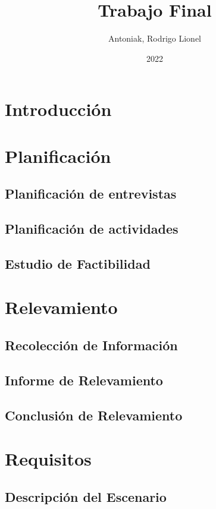 \documentclass[12pt,a4paper]{book}
\title{Trabajo Final}
\author{Antoniak, Rodrigo Lionel}
\date{2022}
\begin{document}
	\frontmatter
	
	\cleardoublepage
	\pagestyle{plain}
	\setcounter{page}{3}
	\tableofcontents
	\listoffigures
	\listoftables
	\cleardoublepage
	\mainmatter
	\pagestyle{headings}
	\setcounter{page}{13}
	\part{Introducción}
	
	\part{Planificación}
	\chapter[Entrevistas]{Planificación de entrevistas}
	
	\chapter[Actividades]{Planificación de actividades}
  
	\chapter[Factibilidad]{Estudio de Factibilidad}
  
	\part{Relevamiento}
	\chapter[Recolección]{Recolección de Información}
	
	\chapter[Informe]{Informe de Relevamiento}
	
	\chapter[Conclusión]{Conclusión de Relevamiento}
	
	\part{Requisitos}
	\chapter[Escenario]{Descripción del Escenario}
	
\end{document}
